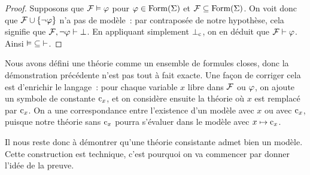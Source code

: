 \begin{proof}
  Supposons que $\mathcal F\vDash \varphi$ pour $\varphi\in\operatorname{Form}(\Sigma)$ et
  $\mathcal F\subseteq\operatorname{Form}(\Sigma)$. On voit donc que
  $\mathcal F\cup\{\lnot \varphi\}$ n'a pas de modèle~: par contraposée de notre
  hypothèse, cela signifie que $\mathcal F,\lnot \varphi\vdash \bot$. En appliquant
  simplement $\bot_{\mathrm{c}}$, on en déduit que $\mathcal F\vdash \varphi$. Ainsi
  $\mathord{\vDash}\subseteq\mathord{\vdash}$.
\end{proof}

\begin{remark}
  Nous avons défini une théorie comme un ensemble de formules closes, donc la
  démonstration précédente n'est pas tout à fait exacte. Une façon de corriger
  cela est d'enrichir le langage~: pour chaque variable $x$ libre dans
  $\mathcal F$ ou $\varphi$, on ajoute un symbole de constante $\mathrm{c}_x$, et on
  considère
  ensuite la théorie où $x$ est remplacé par $\mathrm{c}_x$. On a une correspondance
  entre l'existence d'un modèle avec $x$ ou avec $\mathrm{c}_x$, puisque notre théorie
  sans $\mathrm{c}_x$ pourra s'évaluer dans le modèle avec $x\mapsto \mathrm{c}_x$.
\end{remark}

Il nous reste donc à démontrer qu'une théorie consistante admet bien un modèle.
Cette construction est technique, c'est pourquoi on va commencer par donner
l'idée de la preuve.

